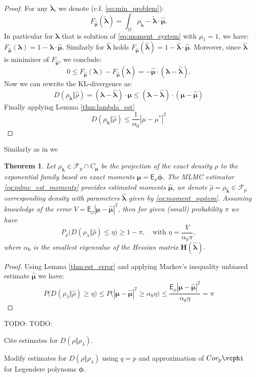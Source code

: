 \documentclass{article}
\newtheorem{theorem}{Theorem}[section]
\def\vc#1{\mathbf{\boldsymbol{#1}}}     %
\def\tn#1{\boldsymbol{#1}}
\def \E{{\mathsf E}}
\def\todo#1{{\color{red}TODO: #1}}
\def\abs#1{|#1|}
\def\tvl{\vc{\tilde\lambda}}
\def\vl{{\vc\lambda}}
\def\estvl{{\vc{\hat\lambda}}}
\def\estrho{\hat\rho}
\def\vmu{\vc\mu}
\def\estvmu{{\vc{\hat\mu}}}
\def\vphi{\vc\phi}
\begin{document}
\begin{proof}
For any $\tvl$, we denote (c.f. \eqref{eq:min_problem}):
\[
F_{\estvmu}(\tvl) = \int_{\Omega} \rho_{\tvl} - \tvl\cdot\estvmu.
\]
In particular for $\vl$ that is solution of \eqref{eq:moment_system} with $\mu_1 = 1$, we have:
$F_{\estvmu}(\vl) = 1 - \vl\cdot\estvmu$. Similarly for $\estvl$ holds
$F_{\estvmu}(\estvl) = 1 - \estvl\cdot\estvmu$. Moreover, since $\estvl$ is minimizer 
of $F_{\estvmu}$, we conclude:
\[
 0\le F_{\estvmu}(\vl) - F_{\estvmu}(\estvl) = - \estvmu\cdot(\vl - \estvl).
\]
Now we can rewrite the KL-divergence as:
\[
  D(\rho_{\vl}\Vert \estrho) = (\vl - \estvl)\cdot \vmu \le
  (\vl - \estvl)\cdot (\vmu - \estvmu)
\]
Finally applying Lemma \ref{thm:lambda_est}
\[
D(\rho_{\vl}\Vert \estrho) \le \frac{1}{\alpha_0} \abs{\mu - \mu^*}^2
\]
 
\end{proof}
Similarly as in \cite[Theorem 3]{Barron1991} we  
\begin{theorem}
  \label{eq:estimate_err_var}
  Let $\rho_{\vl} \in \mathcal F_p \cap C_{\vmu}$ be the projection of the exact density $\rho$ to the exponential family based on exact moments  $\vmu = \E_\rho \vphi$. The MLMC estimator \eqref{eq:mlmc_est_moments} provides estimated moments $\estvmu$, we denote $\estrho = \rho_{\estvl}\in \mathcal F_p$ corresponding density with parameters $\estvl$ given by \eqref{eq:moment_system}.
  Assuming knowledge of the error $V = \E_{\rho} |\vmu - \estvmu|^2$, then for given (small) probability $\pi$
  we have
  \[
      P_{\rho}\Big( D(\rho_{\lambda}\Vert \estrho) \le \eta\Big) \ge 1 - \pi,\quad 
      \text{with } \eta = \frac{V}{\alpha_0 \pi},
  \]
  where $\alpha_0$ is the smallest eigenvalue of the Hessian matrix $\tn H(\estvl)$.
  
\end{theorem}
\begin{proof}
  Using Lemma \ref{thm:est_error} and applying Markov's inequality unbiased estimate $\estvmu$ we have:
  \[
   P\Big( D(\rho_{\lambda}\Vert \estrho) \ge \eta\Big) 
   \le P\Big( \abs{\vmu - \estvmu}^2 \ge \alpha_0  \eta\Big)
   \le \frac{\E_{\rho} |\vmu - \estvmu|^2}{\alpha_0 \eta} = \pi
  \]
\end{proof}


\todo{TODO:}

Cite estimates for $D(\rho\Vert\rho_{\lambda})$.

Modify estimates for $D(\rho\Vert\rho_{\lambda})$ using $q=p$ and
approximation of $Cov_p \vcphi$ for Legendere polynoms $\vc\phi$.
\end{document}
